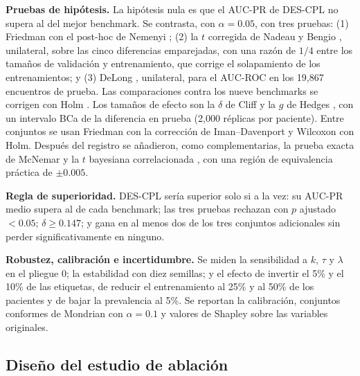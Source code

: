 \documentclass[pdflatex,sn-mathphys-num]{sn-jnl}
\theoremstyle{plain}
\begin{document}
\textbf{Pruebas de hipótesis.} La hipótesis nula es que el AUC-PR de DES-CPL no supera al del mejor benchmark. Se contrasta, con $\alpha=0.05$, con tres pruebas: (1) Friedman \cite{bib_friedman} con el post-hoc de Nemenyi \cite{bib_nemenyi, bib_demsar}; (2) la $t$ corregida de Nadeau y Bengio \cite{bib_nadeau_2003}, unilateral, sobre las cinco diferencias emparejadas, con una razón de $1/4$ entre los tamaños de validación y entrenamiento, que corrige el solapamiento de los entrenamientos; y (3) DeLong \cite{bib_delong}, unilateral, para el AUC-ROC en los 19{,}867 encuentros de prueba. Las comparaciones contra los nueve benchmarks se corrigen con Holm \cite{bib_holm}. Los tamaños de efecto son la $\delta$ de Cliff \cite{bib_cliff} y la $g$ de Hedges \cite{bib_hedges_1981}, con un intervalo BCa \cite{bib_efron} de la diferencia en prueba (2{,}000 réplicas por paciente). Entre conjuntos se usan Friedman con la corrección de Iman--Davenport \cite{bib_iman_davenport_1980} y Wilcoxon \cite{bib_wilcoxon_1945} con Holm. Después del registro se añadieron, como complementarias, la prueba exacta de McNemar \cite{bib_mcnemar_1947} y la $t$ bayesiana correlacionada \cite{bib_corani_2015, bib_benavoli_2017}, con una región de equivalencia práctica de $\pm 0.005$.

\textbf{Regla de superioridad.} DES-CPL sería superior solo si a la vez: su AUC-PR medio supera al de cada benchmark; las tres pruebas rechazan con $p$ ajustado $<0.05$; $\delta\geq 0.147$; y gana en al menos dos de los tres conjuntos adicionales sin perder significativamente en ninguno.

\textbf{Robustez, calibración e incertidumbre.} Se miden la sensibilidad a $k$, $\tau$ y $\lambda$ en el pliegue 0; la estabilidad con diez semillas; y el efecto de invertir el 5\% y el 10\% de las etiquetas, de reducir el entrenamiento al 25\% y al 50\% de los pacientes y de bajar la prevalencia al 5\%. Se reportan la calibración, conjuntos conformes de Mondrian \cite{bib_angelopoulos_2023} con $\alpha=0.1$ y valores de Shapley \cite{bib_lundberg} sobre las variables originales.

\subsection{Diseño del estudio de ablación}\label{subsec:ablacion}
\end{document}
